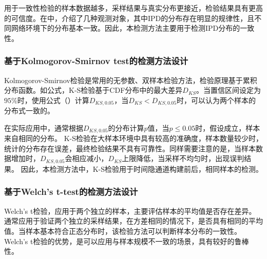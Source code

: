 用于一致性检验的样本数据越多，采样结果与真实分布更接近，检验结果具有更高的可信度。在中，介绍了几种观测对象，其中IPD的分布存在明显的规律性，且不同网络环境下的分布基本一致。因此，本检测方法主要用于检测IPD分布的一致性。

\subsubsection{基于Kolmogorov-Smirnov test的检测方法设计}
\label{chap:analyze:statistical:test:ks}

Kolmogorov-Smirnov检验是常用的无参数、双样本检验方法，检验原理基于累积分布函数。如公式，K-S检验基于CDF分布中的最大差异$D_{KS}$。当置信区间设定为$95\%$时，使用公式（）计算$D_{KS,0.05}$，当$D_{KS}<D_{KS,0.05}$时，可以认为两个样本的分布式一致的。

在实际应用中，通常根据$D_{KS,0.05}$的分布计算$p$值，当$p\leq 0.05$时，假设成立，样本来自相同的分布。
K-S检验在大样本环境中具有较高的准确度，样本数量较少时，统计的分布存在误差，最终检验结果不具有可靠性。同样需要注意的是，当样本数据增加时，$D_{KS,0.05}$会相应减小，$D_{KS}$上限降低，当采样不均匀时，出现误判结果。
因此，本检测方法中，K-S检验用于时间隐通道构建前后，相同样本的检测。

\subsubsection{基于Welch’s t-test的检测方法设计}
\label{chap:analyze:statistical:test:t}

Welch’s t检验，应用于两个独立的样本，主要评估样本的平均值是否存在差异。通常应用于验证两个独立的采样结果，在方差相同的情况下，是否具有相同的平均值。当样本基本符合正态分布时，该检验方法可以判断样本分布的一致性。Welch's t检验的优势，是可以应用与样本规模不一致的场景，具有较好的鲁棒性。



